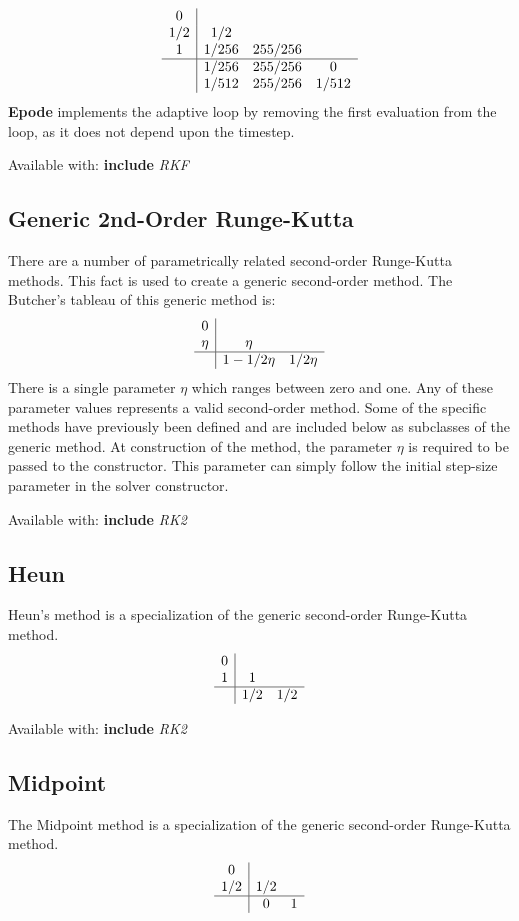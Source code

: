 \documentclass[letterpaper,10pt]{book}
\newcommand{\srcas}[1]{Available with: \textbf{include} \textlangle{}\textit{#1}\textrangle{}}
\newcommand{\epode}[0]{\textbf{Epode}}
\begin{document}
	\[
	  \begin{array}{c|ccc}
	    0 & & &\\
	    1/2 & 1/2 & &\\
	    1 & 1/256 & 255/256 &\\	    
	    \hline
	    & 1/256 & 255/256 & 0\\
	    & 1/512 & 255/256 & 1/512\\
	  \end{array}
	\]    
	\epode{} implements the adaptive loop by removing the first evaluation from the loop, as it does not depend upon the timestep.
	
	\srcas{RKF}
    	
      \subsection{Generic 2nd-Order Runge-Kutta}
	There are a number of parametrically related second-order Runge-Kutta methods.  This fact is used to create a generic second-order method.  The Butcher's tableau of this generic method is:
	\[
	  \begin{array}{c|cc}
	    0 & & \\
	    \eta & \eta & \\
	    \hline
	    & 1-1/2\eta & 1/2\eta
	  \end{array}
	\]
	There is a single parameter $\eta$ which ranges between zero and one.  Any of these parameter values represents a valid second-order method.  Some of the specific methods have previously been defined and are included below as subclasses of the generic method.  At construction of the method, the parameter $\eta$ is required to be passed to the constructor.  This parameter can simply follow the initial step-size parameter in the solver constructor.
	
	\srcas{RK2}
	    
      \subsection{Heun}
	Heun's method is a specialization of the generic second-order Runge-Kutta method.
	\[
	  \begin{array}{c|cc}
	    0 & & \\
	    1 & 1 & \\
	    \hline
	    & 1/2 & 1/2
	  \end{array}
	\]

	\srcas{RK2}
	
      \subsection{Midpoint}
	The Midpoint method is a specialization of the generic second-order Runge-Kutta method.      
	\[
	  \begin{array}{c|cc}
	    0 & & \\
	    1/2 & 1/2 & \\
	    \hline
	    & 0 & 1
	  \end{array}
	\]    
\end{document}
